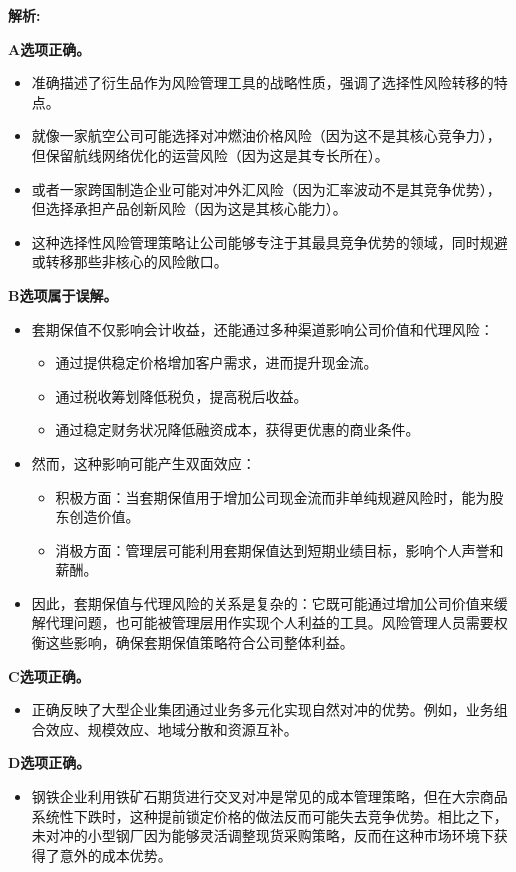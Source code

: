 \documentclass{article}
\newenvironment{explanation}
{\textbf{解析:}\par}
{\par}
\begin{document}
\begin{explanation}
    

    \textbf{A选项正确。}
    \begin{itemize}
        \item 准确描述了衍生品作为风险管理工具的战略性质，强调了选择性风险转移的特点。
        \item 就像一家航空公司可能选择对冲燃油价格风险（因为这不是其核心竞争力），但保留航线网络优化的运营风险（因为这是其专长所在）。
        \item 或者一家跨国制造企业可能对冲外汇风险（因为汇率波动不是其竞争优势），但选择承担产品创新风险（因为这是其核心能力）。
        \item 这种选择性风险管理策略让公司能够专注于其最具竞争优势的领域，同时规避或转移那些非核心的风险敞口。
    \end{itemize}

    \textbf{B选项属于误解。}
    \begin{itemize}
        \item 套期保值不仅影响会计收益，还能通过多种渠道影响公司价值和代理风险：
        \begin{itemize}
            \item 通过提供稳定价格增加客户需求，进而提升现金流。
            \item 通过税收筹划降低税负，提高税后收益。
            \item 通过稳定财务状况降低融资成本，获得更优惠的商业条件。
        \end{itemize}
        \item 然而，这种影响可能产生双面效应：
            \begin{itemize}
                \item 积极方面：当套期保值用于增加公司现金流而非单纯规避风险时，能为股东创造价值。
                \item 消极方面：管理层可能利用套期保值达到短期业绩目标，影响个人声誉和薪酬。
            \end{itemize}
        \item 因此，套期保值与代理风险的关系是复杂的：它既可能通过增加公司价值来缓解代理问题，也可能被管理层用作实现个人利益的工具。风险管理人员需要权衡这些影响，确保套期保值策略符合公司整体利益。

    \end{itemize}

    \textbf{C选项正确。}
    \begin{itemize}
        \item 正确反映了大型企业集团通过业务多元化实现自然对冲的优势。例如，业务组合效应、规模效应、地域分散和资源互补。
    \end{itemize}

    \textbf{D选项正确。}
    \begin{itemize}
        \item 钢铁企业利用铁矿石期货进行交叉对冲是常见的成本管理策略，但在大宗商品系统性下跌时，这种提前锁定价格的做法反而可能失去竞争优势。相比之下，未对冲的小型钢厂因为能够灵活调整现货采购策略，反而在这种市场环境下获得了意外的成本优势。
    \end{itemize}
\end{explanation}
\end{document}
